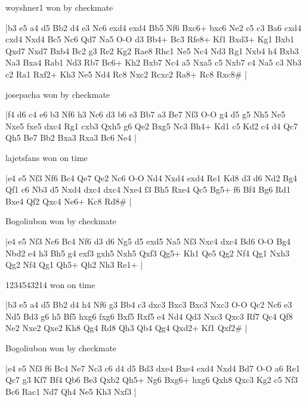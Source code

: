 \showboard

woyshner1 won by checkmate

\makegametitle
|b3 e5 a4 d5 Bb2 d4 e3 Nc6 exd4 exd4 Bb5 Nf6 Bxc6+ bxc6 Ne2 c5 c3 Ba6 cxd4 cxd4 Nxd4 Bc5 Nc6 Qd7 Na5 O-O d3 Bb4+ Bc3 Rfe8+ Kf1 Bxd3+ Kg1 Bxb1 Qxd7 Nxd7 Bxb4 Bc2 g3 Re2 Kg2 Rae8 Rhc1 Ne5 Nc4 Nd3 Rg1 Nxb4 h4 Bxb3 Na3 Bxa4 Rab1 Nd3 Rb7 Bc6+ Kh2 Bxb7 Nc4 a5 Nxa5 c5 Nxb7 c4 Na5 c3 Nb3 c2 Ra1 Rxf2+ Kh3 Ne5 Nd4 Rc8 Nxc2 Rcxc2 Ra8+ Rc8 Rxc8\#  |

\showboard

josepacha won by checkmate

\makegametitle
|f4 d6 c4 e6 b3 Nf6 h3 Nc6 d3 b6 e3 Bb7 a3 Be7 Nf3 O-O g4 d5 g5 Nh5 Ne5 Nxe5 fxe5 dxc4 Rg1 cxb3 Qxh5 g6 Qe2 Bxg5 Nc3 Bh4+ Kd1 c5 Kd2 c4 d4 Qc7 Qh5 Be7 Bb2 Bxa3 Rxa3 Bc6 Ne4  |

\showboard

lajetsfans won on time

\makegametitle
|e4 e5 Nf3 Nf6 Bc4 Qe7 Qe2 Nc6 O-O Nd4 Nxd4 exd4 Re1 Kd8 d3 d6 Nd2 Bg4 Qf1 c6 Nb3 d5 Nxd4 dxc4 dxc4 Nxe4 f3 Bh5 Rxe4 Qc5 Bg5+ f6 Bf4 Bg6 Rd1 Bxe4 Qf2 Qxc4 Ne6+ Kc8 Rd8\#  |

\showboard

Bogoliubon won by checkmate

\makegametitle
|e4 e5 Nf3 Nc6 Bc4 Nf6 d3 d6 Ng5 d5 exd5 Na5 Nf3 Nxc4 dxc4 Bd6 O-O Bg4 Nbd2 e4 h3 Bh5 g4 exf3 gxh5 Nxh5 Qxf3 Qg5+ Kh1 Qe5 Qg2 Nf4 Qg1 Nxh3 Qg2 Nf4 Qg1 Qh5+ Qh2 Nh3 Re1+  |

\showboard

1234543214 won on time

\makegametitle
|b3 e5 a4 d5 Bb2 d4 h4 Nf6 g3 Bb4 c3 dxc3 Bxc3 Bxc3 Nxc3 O-O Qc2 Nc6 e3 Nd5 Bd3 g6 h5 Bf5 hxg6 fxg6 Bxf5 Rxf5 e4 Nd4 Qd3 Nxc3 Qxc3 Rf7 Qc4 Qf8 Ne2 Nxe2 Qxe2 Kh8 Qg4 Rd8 Qh3 Qb4 Qg4 Qxd2+ Kf1 Qxf2\#  |

\showboard

Bogoliubon won by checkmate

\makegametitle
|e4 e5 Nf3 f6 Bc4 Ne7 Nc3 c6 d4 d5 Bd3 dxe4 Bxe4 exd4 Nxd4 Bd7 O-O a6 Re1 Qc7 g3 Kf7 Bf4 Qb6 Be3 Qxb2 Qh5+ Ng6 Bxg6+ hxg6 Qxh8 Qxc3 Kg2 c5 Nf3 Bc6 Rac1 Nd7 Qh4 Ne5 Kh3 Nxf3  |

